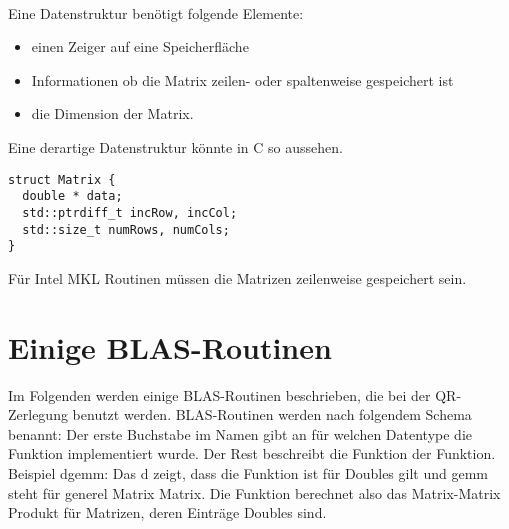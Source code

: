 \\


Eine Datenstruktur benötigt folgende Elemente:
\begin{itemize}
	\item einen Zeiger auf eine Speicherfläche
	\item Informationen ob die Matrix zeilen- oder spaltenweise gespeichert ist 
	\item die Dimension der Matrix.
\end{itemize}


Eine derartige Datenstruktur könnte in C so aussehen.
\begin{lstlisting}
struct Matrix {
  double * data;
  std::ptrdiff_t incRow, incCol;
  std::size_t numRows, numCols;
}
\end{lstlisting}

Für Intel MKL Routinen müssen die Matrizen zeilenweise gespeichert sein.

\newpage
\section{Einige BLAS-Routinen}
Im Folgenden werden einige BLAS-Routinen beschrieben, die bei der QR-Zerlegung benutzt werden.
BLAS-Routinen werden nach folgendem Schema benannt:
Der erste Buchstabe im Namen gibt an für welchen Datentype die Funktion implementiert wurde. Der Rest beschreibt die Funktion der Funktion.\\
Beispiel \glqq dgemm\grqq{}: Das \glqq d\grqq{} zeigt, dass die Funktion ist für Doubles gilt und  \glqq gemm\grqq{} steht für \glqq generel Matrix Matrix\grqq{}. Die  Funktion berechnet also das Matrix-Matrix Produkt für Matrizen, deren Einträge Doubles sind.

